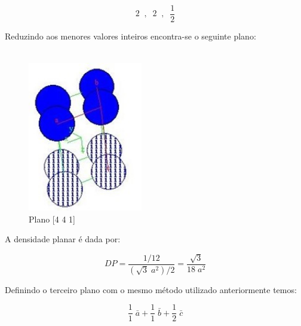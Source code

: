 \documentclass[10pt,twocolumn,letterpaper]{article}
\begin{document}

\vspace{-0.25cm}

\begin{equation*}
    2 \;\; , \;\; 2 \;\; , \;\; \frac{1}{2}
\end{equation*}

\hspace{1cm} Reduzindo aos menores valores inteiros encontra-se o seguinte plano:

\vspace{-0.75cm}

\begin{align*}
    [ \; 4 \; 4 \; 1 \;]
\end{align*}

\vspace{-0.5cm}

\begin{figure}[h]
    \centering
    \includegraphics[width=5cm]{fig5.jpg}
    \caption{Plano [4 4 1]}
    \label{fig:label}
\end{figure}

\hspace{1cm} A densidade planar é dada por:

\begin{equation*}
    DP = \frac{1/12}{(\sqrt{3}\;a^2)/2} = \frac{\sqrt{3}}{18\;a^2}
\end{equation*}

\hspace{1cm} Definindo o terceiro plano com o mesmo método utilizado anteriormente temos:

\begin{equation*}
    \frac{1}{1}\;\bar{a} + \frac{1}{1}\;\bar{b} + \frac{1}{2}\;\bar{c}
\end{equation*}
\end{document}

